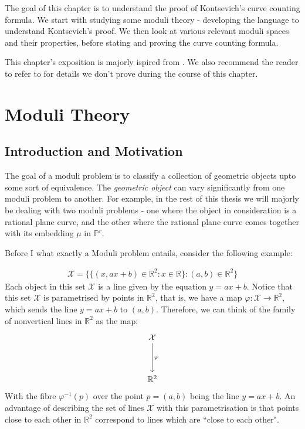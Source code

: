 
The goal of this chapter is to understand the proof of Kontsevich's curve counting formula.
We start with studying some moduli theory - developing the language to understand Kontsevich's proof.
We then look at various relevant moduli spaces and their properties, before stating and proving the curve counting formula.

\par This chapter's exposition is majorly ispired from \cite{KockQcohom}. We also recommend the reader to refer to \cite{FPnotes} for details we don't prove during the course of this chapter.

\section{Moduli Theory}

\subsection{Introduction and Motivation}
The goal of a moduli problem is to classify a collection of geometric objects upto some sort of equivalence.
The \textit{geometric object} can vary significantly from one moduli problem to another. 
For example, in the rest of this thesis we will majorly be dealing with two moduli problems - one where the object in consideration is a rational plane curve, and the other where the rational plane curve comes together with its embedding $\mu$ in $\mathbb{P}^{r}$.

Before I what exactly a Moduli problem entails, consider the following example:

\begin{example}
    \label{exLinesInPlane}
\begin{align*}
    \mathcal{X} = \{\{(x, ax + b) \in \mathbb{R}^{2}: x \in \mathbb{R}\} : (a,b) \in \mathbb{R}^{2}\}
\end{align*}
Each object in this set $\mathcal{X}$ is a line given by the equation $y = ax + b$.
Notice that this set $\mathcal{X}$ is parametrised by points in $\mathbb{R}^{2}$, that is, we have a map $\varphi: \mathcal{X} \to \mathbb{R}^{2}$, which sends the line $y = ax + b$ to $(a,b)$.  
Therefore, we can think of the family of nonvertical lines in $\mathbb{R}^{2}$ as the map:
\[\begin{tikzcd}
	{\mathcal{X}} \\
	\\
	{\mathbb{R}^2}
	\arrow["\varphi",from=1-1, to=3-1]
\end{tikzcd}\]
With the fibre $\varphi^{-1}(p)$ over the point $p = (a,b)$ being the line $y = ax + b$.
An advantage of describing the set of lines $\mathcal{X}$ with this parametrisation is that points close to each other in $\mathbb{R}^{2}$ correspond to lines which are ``close to each other".  

\end{example}


